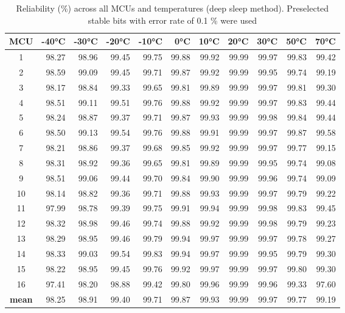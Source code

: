 \begin{table}[ht!]
    \centering
    \begin{tabular}{c||rrrrrrrrrr}
    \toprule
    \textbf{MCU} & \textbf{-40°C} & \textbf{-30°C} & \textbf{-20°C} & \textbf{-10°C} & \textbf{0°C} & \textbf{10°C} & \textbf{20°C} & \textbf{30°C} & \textbf{50°C} & \textbf{70°C} \\
    \midrule
    1    &  98.27 &  98.96 &  99.45 &  99.75 & 99.88 & 99.92 & 99.99 & 99.97 & 99.83 & 99.42 \\
    2    &  98.59 &  99.09 &  99.45 &  99.71 & 99.87 & 99.92 & 99.99 & 99.95 & 99.74 & 99.19 \\
    3    &  98.17 &  98.84 &  99.33 &  99.65 & 99.81 & 99.89 & 99.99 & 99.97 & 99.81 & 99.30 \\
    4    &  98.51 &  99.11 &  99.51 &  99.76 & 99.88 & 99.92 & 99.99 & 99.97 & 99.83 & 99.44 \\
    5    &  98.24 &  98.87 &  99.37 &  99.71 & 99.87 & 99.93 & 99.99 & 99.98 & 99.84 & 99.44 \\
    6    &  98.50 &  99.13 &  99.54 &  99.76 & 99.88 & 99.91 & 99.99 & 99.97 & 99.87 & 99.58 \\
    7    &  98.21 &  98.86 &  99.37 &  99.68 & 99.85 & 99.92 & 99.99 & 99.97 & 99.77 & 99.15 \\
    8    &  98.31 &  98.92 &  99.36 &  99.65 & 99.81 & 99.89 & 99.99 & 99.95 & 99.74 & 99.08 \\
    9    &  98.51 &  99.06 &  99.44 &  99.70 & 99.84 & 99.90 & 99.99 & 99.96 & 99.74 & 99.09 \\
    10   &  98.14 &  98.82 &  99.36 &  99.71 & 99.88 & 99.93 & 99.99 & 99.97 & 99.79 & 99.22 \\
    11   &  97.99 &  98.78 &  99.39 &  99.75 & 99.91 & 99.94 & 99.99 & 99.98 & 99.83 & 99.45 \\
    12   &  98.32 &  98.98 &  99.46 &  99.74 & 99.88 & 99.92 & 99.99 & 99.98 & 99.79 & 99.23 \\
    13   &  98.29 &  98.95 &  99.46 &  99.79 & 99.94 & 99.97 & 99.99 & 99.97 & 99.78 & 99.27 \\
    14   &  98.33 &  99.03 &  99.54 &  99.83 & 99.94 & 99.97 & 99.99 & 99.95 & 99.79 & 99.30 \\
    15   &  98.22 &  98.95 &  99.45 &  99.76 & 99.92 & 99.97 & 99.99 & 99.97 & 99.80 & 99.30 \\
    16   &  97.41 &  98.20 &  98.88 &  99.42 & 99.80 & 99.96 & 99.99 & 99.96 & 99.33 & 97.60 \\
    \textbf{mean} &  98.25 &  98.91 &  99.40 &  99.71 & 99.87 & 99.93 & 99.99 & 99.97 & 99.77 & 99.19 \\
    \bottomrule
    \end{tabular}
    \captionsetup{justification=centering,margin=0.5cm}
    \caption{Reliability (\%) across all MCUs and temperatures (deep sleep method). Preselected stable bits with error rate of 0.1 \% were used}
    \label{table:reliability_stable_bits}
    \vspace{-1.5em}
\end{table}

